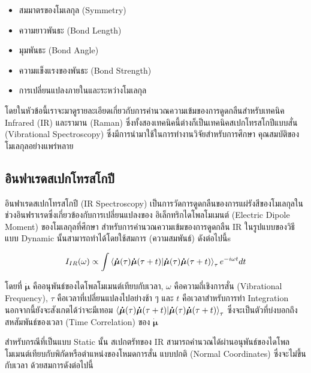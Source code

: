 \begin{itemize}
    \item สมมาตรของโมเลกุล (Symmetry)
    
    \item ความยาวพันธะ (Bond Length)
    
    \item มุมพันธะ (Bond Angle)
    
    \item ความแข็งแรงของพันธะ (Bond Strength)
    
    \item การเปลี่ยนแปลงภายในและระหว่างโมเลกุล
\end{itemize}

\noindent โดยในหัวข้อนี้เราจะมาดูรายละเอียดเกี่ยวกับการคำนวณความเข้มของการดูดกลืนสำหรับเทคนิค Infrared (IR) และรามาน (Raman) 
ซึ่งทั้งสองเทคนิคนี้ต่างก็เป็นเทคนิคสเปกโทรสโกปีแบบสั่น (Vibrational Spectroscopy) ซึ่งมีการนำมาใช้ในการทำงานวิจัยสำหรับการศึกษา%
คุณสมบัติของโมเลกุลอย่างแพร่หลาย

\subsection{อินฟาเรดสเปกโทรสโกปี}
\label{ssec:ir_spectro}

อินฟาเรดสเปกโทรสโกปี (IR Spectroscopy) เป็นการวัดการดูดกลืนของการแผ่รังสีของโมเลกุลในช่วงอินฟราเรดซึ่งเกี่ยวข้องกับการเปลี่ยนแปลงของ%
อิเล็กทริกไดโพลโมเมนต์ (Electric Dipole Moment) ของโมเลกุลที่ศึกษา สำหรับการคำนวณความเข้มของการดูดกลืน IR ในรูปแบบของวิธีแบบ
Dynamic นั้นสามารถทำได้โดยใช้สมการ (ความสมพันธ์) ดังต่อไปนี้s\autocite{thomas2013}

\begin{equation}\label{eq:IR_corr}
    I_{IR} (\omega) \propto \int \braket{\bm{\dot{\mu}}(\tau) \bm{\dot{\mu}}(\tau+t)}_{\tau} e^{-i \omega t} dt
\end{equation}

\noindent โดยที่ $\bm{\dot{\mu}}$ คืออนุพันธ์ของไดโพลโมเมนต์เทียบกับเวลา, $\omega$ คือความถี่เชิงการสั่น (Vibrational Frequency),
$\tau$ คือเวลาที่เปลี่ยนแปลงไปอย่างช้า ๆ และ $t$ คือเวลาสำหรับการทำ Integration นอกจากนี้ยังจะสังเกตได้ว่าจะมีเทอม
$\braket{\bm{\dot{\mu}}(\tau) \bm{\dot{\mu}}(\tau+t)}_{\tau}$ ซึ่งจะเป็นตัวที่บ่งบอกถึงสหสัมพันธ์ของเวลา (Time Correlation) 
ของ $\bm{\dot{\mu}}$ 

สำหรับกรณีที่เป็นแบบ Static นั้น สเปกตรัทของ IR สามารถคำนวณได้ผ่านอนุพันธ์ของไดโพลโมเมนต์เทียบกับพิกัดหรือตำแหน่งของโหมดการสั่น%
แบบปกติ (Normal Coordinates) ซึ่งจะไม่ขึ้นกับเวลา ด้วยสมการดังต่อไปนี้


